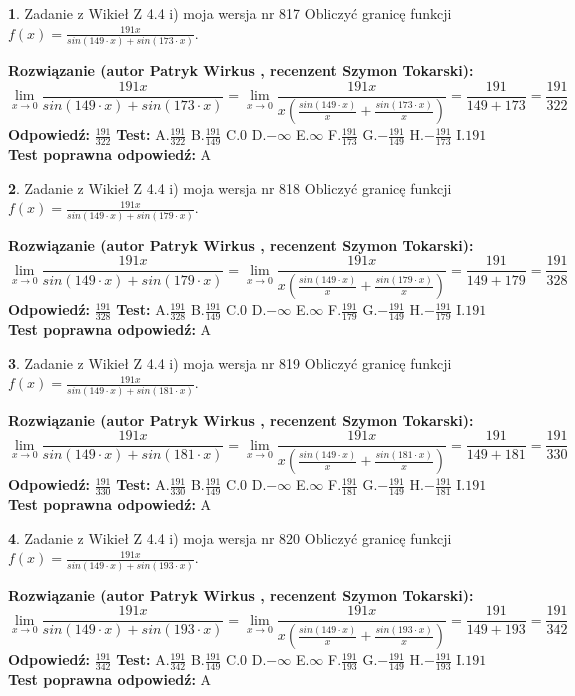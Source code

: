 \documentclass[12pt, a4paper]{article}
\theoremstyle{definition} %
\newtheorem{zad}{}
\newcommand{\zadStart}[1]{\begin{zad}#1\newline}
\newcommand{\zadStop}{\end{zad}}
\newcommand{\rozwStart}[2]{\noindent \textbf{Rozwiązanie (autor #1 , recenzent #2): }\newline}
\newcommand{\rozwStop}{\newline}
\newcommand{\odpStart}{\noindent \textbf{Odpowiedź:}\newline}
\newcommand{\odpStop}{\newline}
\newcommand{\testStart}{\noindent \textbf{Test:}\newline}
\newcommand{\testStop}{\newline}
\newcommand{\kluczStart}{\noindent \textbf{Test poprawna odpowiedź:}\newline}
\newcommand{\kluczStop}{\newline}
\begin{document}
\zadStart{Zadanie z Wikieł Z 4.4 i) moja wersja nr 817}
Obliczyć granicę funkcji $f(x)=\frac{191x}{sin(149\cdot x) +sin(173\cdot x)}$.
\zadStop
\rozwStart{Patryk Wirkus}{Szymon Tokarski}
$$\lim\limits_{x\to 0}\frac{191x}{sin(149\cdot x) +sin(173\cdot x)}=\lim\limits_{x\to 0}\frac{191x}{x(\frac{sin(149\cdot x)}{x}+\frac{sin(173\cdot x)}{x})}=\frac{191}{149+173} = \frac{191}{322}$$
\rozwStop
\odpStart
$\frac{191}{322}$
\odpStop
\testStart
A.$\frac{191}{322}$
B.$\frac{191}{149}$
C.$0$
D.$-\infty$
E.$\infty$
F.$\frac{191}{173}$
G.$-\frac{191}{149}$
H.$-\frac{191}{173}$
I.$191$
\testStop
\kluczStart
A
\kluczStop



\zadStart{Zadanie z Wikieł Z 4.4 i) moja wersja nr 818}
Obliczyć granicę funkcji $f(x)=\frac{191x}{sin(149\cdot x) +sin(179\cdot x)}$.
\zadStop
\rozwStart{Patryk Wirkus}{Szymon Tokarski}
$$\lim\limits_{x\to 0}\frac{191x}{sin(149\cdot x) +sin(179\cdot x)}=\lim\limits_{x\to 0}\frac{191x}{x(\frac{sin(149\cdot x)}{x}+\frac{sin(179\cdot x)}{x})}=\frac{191}{149+179} = \frac{191}{328}$$
\rozwStop
\odpStart
$\frac{191}{328}$
\odpStop
\testStart
A.$\frac{191}{328}$
B.$\frac{191}{149}$
C.$0$
D.$-\infty$
E.$\infty$
F.$\frac{191}{179}$
G.$-\frac{191}{149}$
H.$-\frac{191}{179}$
I.$191$
\testStop
\kluczStart
A
\kluczStop



\zadStart{Zadanie z Wikieł Z 4.4 i) moja wersja nr 819}
Obliczyć granicę funkcji $f(x)=\frac{191x}{sin(149\cdot x) +sin(181\cdot x)}$.
\zadStop
\rozwStart{Patryk Wirkus}{Szymon Tokarski}
$$\lim\limits_{x\to 0}\frac{191x}{sin(149\cdot x) +sin(181\cdot x)}=\lim\limits_{x\to 0}\frac{191x}{x(\frac{sin(149\cdot x)}{x}+\frac{sin(181\cdot x)}{x})}=\frac{191}{149+181} = \frac{191}{330}$$
\rozwStop
\odpStart
$\frac{191}{330}$
\odpStop
\testStart
A.$\frac{191}{330}$
B.$\frac{191}{149}$
C.$0$
D.$-\infty$
E.$\infty$
F.$\frac{191}{181}$
G.$-\frac{191}{149}$
H.$-\frac{191}{181}$
I.$191$
\testStop
\kluczStart
A
\kluczStop



\zadStart{Zadanie z Wikieł Z 4.4 i) moja wersja nr 820}
Obliczyć granicę funkcji $f(x)=\frac{191x}{sin(149\cdot x) +sin(193\cdot x)}$.
\zadStop
\rozwStart{Patryk Wirkus}{Szymon Tokarski}
$$\lim\limits_{x\to 0}\frac{191x}{sin(149\cdot x) +sin(193\cdot x)}=\lim\limits_{x\to 0}\frac{191x}{x(\frac{sin(149\cdot x)}{x}+\frac{sin(193\cdot x)}{x})}=\frac{191}{149+193} = \frac{191}{342}$$
\rozwStop
\odpStart
$\frac{191}{342}$
\odpStop
\testStart
A.$\frac{191}{342}$
B.$\frac{191}{149}$
C.$0$
D.$-\infty$
E.$\infty$
F.$\frac{191}{193}$
G.$-\frac{191}{149}$
H.$-\frac{191}{193}$
I.$191$
\testStop
\kluczStart
A
\kluczStop
\end{document}
